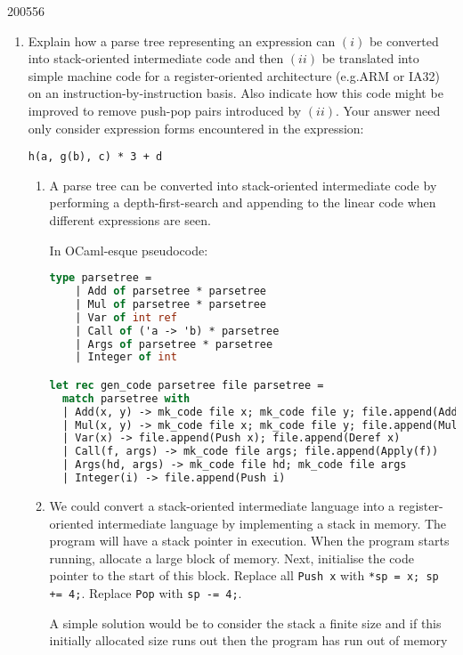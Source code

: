 \documentclass[10pt,\jkfside,a4paper]{article}
\begin{document}
\begin{examquestion}{2005}{5}{6}

\begin{enumerate}

\item Explain how a parse tree representing an expression can $(i)$ be
converted into stack-oriented intermediate code and then $(ii)$ be
translated into simple machine code for a register-oriented architecture
(e.g.\@ ARM or IA32) on an instruction-by-instruction basis. Also indicate
how this code might be improved to remove push-pop pairs introduced by
$(ii)$. Your answer need only consider expression forms encountered in the
expression:
\begin{center}
\texttt{h(a, g(b), c) * 3 + d}
\end{center}

\begin{enumerate}

\item A parse tree can be converted into stack-oriented intermediate code by
performing a depth-first-search and appending to the linear code when
different expressions are seen.

In OCaml-esque pseudocode:
\begin{lstlisting}[language=Caml]
type parsetree =
	| Add of parsetree * parsetree
	| Mul of parsetree * parsetree
	| Var of int ref
	| Call of ('a -> 'b) * parsetree
	| Args of parsetree * parsetree
	| Integer of int

let rec gen_code parsetree file parsetree =
  match parsetree with
  | Add(x, y) -> mk_code file x; mk_code file y; file.append(Add)
  | Mul(x, y) -> mk_code file x; mk_code file y; file.append(Mul)
  | Var(x) -> file.append(Push x); file.append(Deref x)
  | Call(f, args) -> mk_code file args; file.append(Apply(f))
  | Args(hd, args) -> mk_code file hd; mk_code file args
  | Integer(i) -> file.append(Push i)
\end{lstlisting}

\item \iffalse
We could convert a stack-oriented intermediate language into a
register-oriented intermediate language by implementing a stack in memory.
The program will have a stack pointer in execution. When the program starts
running, allocate a large block of memory. Next, initialise the code
pointer to the start of this block. Replace all \texttt{Push x} with
\texttt{*sp = x; sp += 4;}. Replace \texttt{Pop} with \texttt{sp -= 4;}.

A simple solution would be to consider the stack a finite size and if this
initially allocated size runs out then the program has run out of memory


\end{enumerate}
\end{enumerate}
\end{examquestion}
\end{document}
